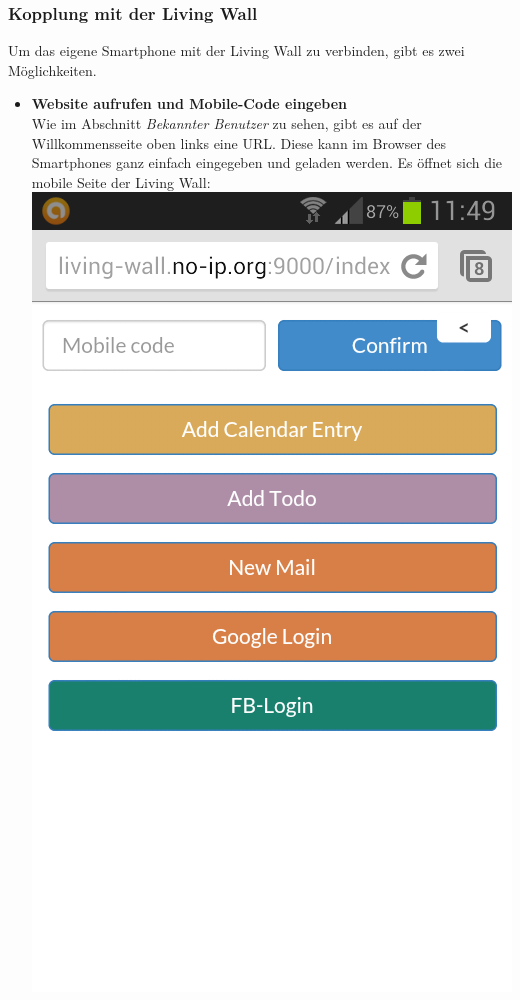 \documentclass[10pt,a4paper]{report}
\begin{document}
		\subsubsection{Kopplung mit der Living Wall}
		Um das eigene Smartphone mit der Living Wall zu verbinden, gibt es zwei Möglichkeiten.
			\begin{itemize}
				\item \textbf{Website aufrufen und Mobile-Code eingeben}\\
				Wie im Abschnitt \textit{Bekannter Benutzer} zu sehen, gibt es auf der Willkommensseite oben links eine URL. Diese kann im Browser des Smartphones ganz einfach eingegeben und geladen werden. Es öffnet sich die mobile Seite der Living Wall:\\
				\includegraphics[scale=0.3, trim=0 8cm 0 0]{mobile}\\

\end{itemize}
\end{document}
